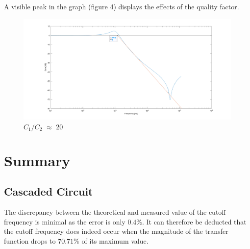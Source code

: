 \documentclass{scrartcl}
\begin{document}
A visible peak in the graph (figure 4) displays the effects of the quality factor.

\begin{figure}[h!]
    \centering
    \includegraphics[width=14cm]{20ratio20.png}
    \caption{$C_1/C_2$ $\approx$ 20}
    \label{fig:my_label}
\end{figure}


\section{Summary}

\subsection{Cascaded Circuit}
The discrepancy between the theoretical and measured value of the cutoff frequency is minimal as the error is only $0.4\%$. It can therefore be deducted that the cutoff frequency does indeed occur when the magnitude of the transfer function drops to $70.71\%$ of its maximum value.
\end{document}
